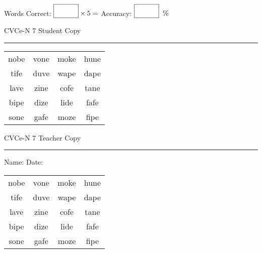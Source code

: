 \documentclass{memoir}
\begin{document}
\small

Words Correct: $\fbox{\phantom{\huge 100}} \times 5 = $ Accuracy: $\fbox{\phantom{\huge 100}}\;\; \%$ 

\vfill

\newpage


\footnotesize \noindent
CVCe-N 7 \hfill Student Copy
\smallskip
\hrule

\Large

\setlength{\tabcolsep}{14pt}
\def\arraystretch{2}

{\selectfont


\begin{vplace}[0.5]
\begin{center}
\begin{tabular}{cccc}
nobe & vone & moke & hune \\
tife & duve & wape & dape \\
lave & zine & cofe & tane \\
bipe & dize & lide & fafe \\
sone & gafe & moze & fipe \\
\end{tabular}
\end{center}
\end{vplace}

}

\newpage

\footnotesize \noindent
CVCe-N 7 \hfill Teacher Copy
\smallskip
\hrule

\small

\vfill

\noindent
Name: \underline{\hspace{1.75in}} \hfill Date: \underline{\hspace{1in}}

\Large

{\selectfont


\begin{vplace}[0.5]
\begin{center}
\begin{tabular}{cccc}
nobe & vone & moke & hune \\
tife & duve & wape & dape \\
lave & zine & cofe & tane \\
bipe & dize & lide & fafe \\
sone & gafe & moze & fipe \\
\end{tabular}
\end{center}
\end{vplace}



}
\end{document}
